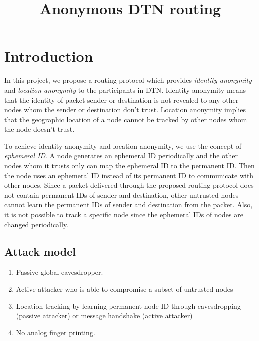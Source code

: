 \documentclass[11pt]{article}
\begin{document}
\title{Anonymous DTN routing}
\maketitle

\section{Introduction}
In this project, we propose a routing protocol which provides \textit{identity anonymity} and \textit{location anonymity} to the participants in DTN.  Identity anonymity means that the identity of packet sender or destination is not revealed to any other nodes whom the sender or destination don't trust.  Location anonymity implies that the geographic location of a node cannot be tracked by other nodes whom the node doesn't trust.  

To achieve identity anonymity and location anonymity, we use the concept of \textit{ephemeral ID}.  A node generates an ephemeral ID periodically and the other nodes whom it trusts only can map the ephemeral ID to the permanent ID.  Then the node uses an ephemeral ID instead of its permanent ID to communicate with other nodes.  Since a packet delivered through the proposed routing protocol does not contain permanent IDs of sender and destination, other untrusted nodes cannot learn the permanent IDs of sender and destination from the packet.  Also, it is not possible to track a specific node since the ephemeral IDs of nodes are changed periodically. 


\subsection{Attack model}
\begin{enumerate}
\item Passive global eavesdropper.
\item Active attacker who is able to compromise a subset of untrusted nodes
\item Location tracking by learning permanent node ID through eavesdropping (passive attacker) or message handshake (active attacker)
\item No analog finger printing.
\end{enumerate}
\end{document}
